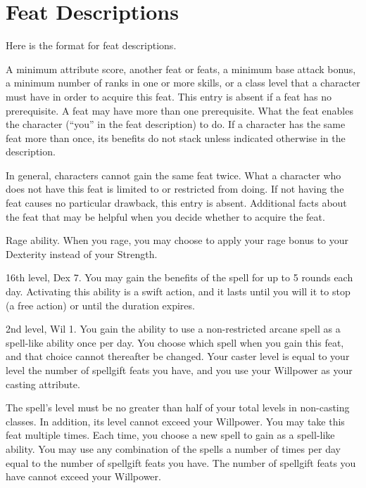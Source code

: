 \twocolumn

\section{Feat Descriptions}
Here is the format for feat descriptions.

\featpre A minimum attribute score, another feat or feats, a minimum base attack bonus, a minimum number of ranks in one or more skills, or a class level that a character must have in order to acquire this feat.
This entry is absent if a feat has no prerequisite.
A feat may have more than one prerequisite.
\featben What the feat enables the character (``you'' in the feat description) to do.
If a character has the same feat more than once, its benefits do not stack unless indicated otherwise in the description.
\par In general, characters cannot gain the same feat twice.
What a character who does not have this feat is limited to or restricted from doing.
If not having the feat causes no particular drawback, this entry is absent.
Additional facts about the feat that may be helpful when you decide whether to acquire the feat.

\featpre Rage ability.
\featben When you rage, you may choose to apply your rage bonus to your Dexterity instead of your Strength.

\featpre 16th level, Dex 7.
\featben You may gain the benefits of the 
spell for up to 5 rounds each day.
Activating this ability is a swift action, and it lasts until you will it to stop (a free action) or until the duration expires.

\featpre 2nd level, Wil 1.
\featben You gain the ability to use a non-restricted arcane spell as a spell-like ability once per day.
You choose which spell when you gain this feat, and that choice cannot thereafter be changed.
Your caster level is equal to your level \add the number of spellgift feats you have, and you use your Willpower as your casting attribute.

The spell's level must be no greater than half of your total levels in non-casting classes.
In addition, its level cannot exceed your Willpower.
You may take this feat multiple times.
Each time, you choose a new spell to gain as a spell-like ability.
You may use any combination of the spells a number of times per day equal to the number of spellgift feats you have.
The number of spellgift feats you have cannot exceed your Willpower.

